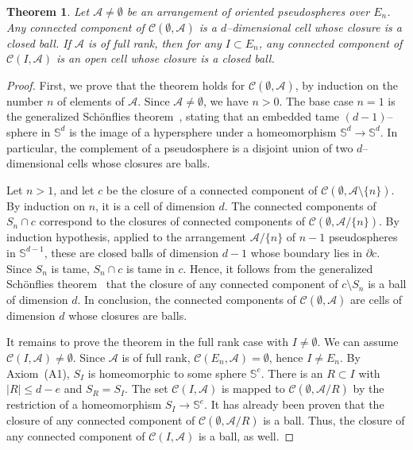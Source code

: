 \documentclass[a4paper]{amsart}
\newcommand{\p}{\mathbb S}
\renewcommand{\d}{\partial}
\newcommand{\C}{\mathcal C}
\newtheorem{theorem}{Theorem}
\theoremstyle{definition}
\theoremstyle{remark}
\begin{document}
\begin{theorem}\label{thm:cells}
  Let $\mathcal A\not=\emptyset$ be an arrangement of oriented
  pseudospheres over $E_n$. Any connected component of
  $\C(\emptyset,\mathcal A)$  is a $d$--dimensional cell whose closure
  is a closed ball.  If $\mathcal A$ is of full rank, then for any
  $I\subset E_n$, any connected component of  $\C(I,\mathcal A)$ is an
  open cell whose closure is a closed ball.
\end{theorem}
%
\begin{proof}
  First, we prove that the theorem holds for $\C(\emptyset,\mathcal A)$,
  by induction on the number $n$ of elements of $\mathcal A$. 
  Since $\mathcal A \not=\emptyset$, we have $n>0$. 
  The base case $n=1$ is the generalized Sch\"onflies
  theorem~\cite{brown}, stating that an embedded
  tame $(d-1)$--sphere in $\p^d$ is the image of a hypersphere under a
  homeomorphism $\p^d\to\p^d$. 
  In particular, the complement of a pseudosphere is a disjoint union of
  two $d$--dimensional cells whose closures are balls.

  Let $n>1$, and let $c$ be the closure of a
  connected component of $\C(\emptyset,\mathcal A\setminus \{n\})$. By
  induction on $n$, it is a cell of dimension $d$.
%
  The  connected components of $S_n\cap c$ correspond to the closures of
  connected components of $\C(\emptyset, \mathcal A/\{n\})$. By
  induction hypothesis, applied to the arrangement $\mathcal A/\{n\}$ of 
  $n-1$ pseudospheres in $\p^{d-1}$, these are closed balls of dimension
  $d-1$ whose boundary lies in $\d  c$.  
%
  Since $S_n$ is tame, $S_n\cap c$ is tame in $c$. Hence, it follows
  from the generalized Sch\"onflies theorem~\cite{brown} that the
  closure of any connected component of $c\setminus S_n$ is a ball of
  dimension $d$.
  In conclusion,
  the connected components of $\C(\emptyset,\mathcal A)$ are cells of
  dimension $d$ whose closures are balls.

  It remains to prove the theorem in the full rank case with
  $I\not=\emptyset$. 
  We can assume $\C(I,\mathcal A)\not=\emptyset$.
  Since $\mathcal A$ is of full rank, $\C(E_n, \mathcal
  A)=\emptyset$, hence $I\not= E_n$.
%
  By Axiom~(A1), $S_I$ is homeomorphic to some
  sphere $\p^e$. There is an $R\subset I$ with $|R|\le d-e$ and
  $S_R = S_I$. 
  The set $\C(I,\mathcal A)$  is mapped to $\C(\emptyset,  \mathcal A/R)$
  by the restriction of a homeomorphism $S_I\to \p^e$. 
  It has already been proven that the closure of any connected component  of
  $\C(\emptyset,  \mathcal A/R)$ is a ball. Thus, the closure of any connected
  component of  $\C(I,\mathcal A)$ is a ball, as well. 
\end{proof}
\end{document}

